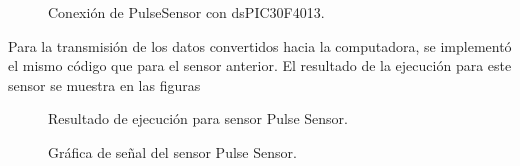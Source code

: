 	\begin{figure}[htbp!]
		\centering
		\caption{Conexión de PulseSensor con dsPIC30F4013.}
		\label{fig:ConexionPulseSensor}
	\end{figure}

Para la transmisión de los datos convertidos hacia la computadora, se implementó el mismo código que para el sensor anterior. El resultado de la ejecución para este sensor se muestra en las figuras
	
	\begin{figure}[htbp!]
		\centering
		\caption{Resultado de ejecución para sensor Pulse Sensor.}
		\label{fig:TerminalPulseSensor}
	\end{figure}
	
	\begin{figure}[htbp!]
		\centering
		\caption{Gráfica de señal del sensor Pulse Sensor.}
		\label{fig:GraficaPulseSensor}
	\end{figure}
	
	\pagebreak